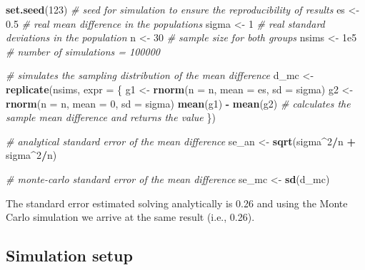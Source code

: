 \documentclass[
  man,floatsintext]{apa6}
\newenvironment{Shaded}{\begin{snugshade}}{\end{snugshade}}
\newcommand{\AttributeTok}[1]{\textcolor[rgb]{0.13,0.29,0.53}{#1}}
\newcommand{\CommentTok}[1]{\textcolor[rgb]{0.56,0.35,0.01}{\textit{#1}}}
\newcommand{\DecValTok}[1]{\textcolor[rgb]{0.00,0.00,0.81}{#1}}
\newcommand{\FloatTok}[1]{\textcolor[rgb]{0.00,0.00,0.81}{#1}}
\newcommand{\FunctionTok}[1]{\textcolor[rgb]{0.13,0.29,0.53}{\textbf{#1}}}
\newcommand{\NormalTok}[1]{#1}
\newcommand{\OtherTok}[1]{\textcolor[rgb]{0.56,0.35,0.01}{#1}}
\newcommand{\SpecialCharTok}[1]{\textcolor[rgb]{0.81,0.36,0.00}{\textbf{#1}}}
\begin{document}
\begin{Shaded}
\begin{Highlighting}[]
\FunctionTok{set.seed}\NormalTok{(}\DecValTok{123}\NormalTok{) }\CommentTok{\# seed for simulation to ensure the reproducibility of results}
\NormalTok{es }\OtherTok{\textless{}{-}} \FloatTok{0.5} \CommentTok{\# real mean difference in the populations}
\NormalTok{sigma }\OtherTok{\textless{}{-}} \DecValTok{1} \CommentTok{\# real standard deviations in the population}
\NormalTok{n }\OtherTok{\textless{}{-}} \DecValTok{30} \CommentTok{\# sample size for both groups}
\NormalTok{nsims }\OtherTok{\textless{}{-}} \FloatTok{1e5} \CommentTok{\# number of simulations = 100000}

\CommentTok{\# simulates the sampling distribution of the mean difference}
\NormalTok{d\_mc }\OtherTok{\textless{}{-}} \FunctionTok{replicate}\NormalTok{(nsims, }\AttributeTok{expr =}\NormalTok{ \{}
\NormalTok{  g1 }\OtherTok{\textless{}{-}} \FunctionTok{rnorm}\NormalTok{(}\AttributeTok{n =}\NormalTok{ n, }\AttributeTok{mean =}\NormalTok{ es, }\AttributeTok{sd =}\NormalTok{ sigma)}
\NormalTok{  g2 }\OtherTok{\textless{}{-}} \FunctionTok{rnorm}\NormalTok{(}\AttributeTok{n =}\NormalTok{ n, }\AttributeTok{mean =} \DecValTok{0}\NormalTok{, }\AttributeTok{sd =}\NormalTok{ sigma)}
  \FunctionTok{mean}\NormalTok{(g1) }\SpecialCharTok{{-}} \FunctionTok{mean}\NormalTok{(g2) }\CommentTok{\# calculates the sample mean difference and returns the value}
\NormalTok{\})}

\CommentTok{\# analytical standard error of the mean difference}
\NormalTok{se\_an }\OtherTok{\textless{}{-}} \FunctionTok{sqrt}\NormalTok{(sigma}\SpecialCharTok{\^{}}\DecValTok{2}\SpecialCharTok{/}\NormalTok{n }\SpecialCharTok{+}\NormalTok{ sigma}\SpecialCharTok{\^{}}\DecValTok{2}\SpecialCharTok{/}\NormalTok{n)}

\CommentTok{\# monte{-}carlo standard error of the mean difference}
\NormalTok{se\_mc }\OtherTok{\textless{}{-}} \FunctionTok{sd}\NormalTok{(d\_mc)}
\end{Highlighting}
\end{Shaded}

\normalsize

The standard error estimated solving analytically is 0.26 and using the Monte Carlo simulation we arrive at the same result (i.e., 0.26).

\subsection{Simulation setup}\label{simulation-setup}
\end{document}
